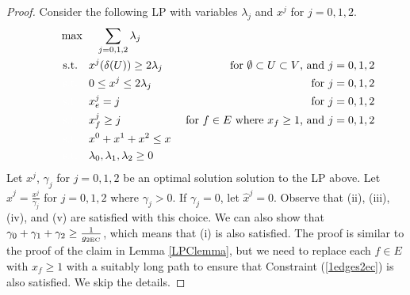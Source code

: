 \begin{proof}
	Consider the following LP with variables $\lambda_j$ and $x^j$ for $j=0,1,2$. 
	\begin{align}
		\quad\quad& \max\quad \;\sum_{j=0,1,2}\lambda_j\\
		&\;\text{s.t.} \quad x^j(\delta(U))\geq 2\lambda_j \;& \mbox{ for $\emptyset \subset U \subset V$, and $j=0,1,2$} \label{feasibility2ec}\\
		&\;{\color{white}{\text{s.t.}} }\quad 0 \leq x^j \leq 2\lambda_j\; &\mbox{ for $j=0,1,2$}\label{bound2ec}\\
		&\;{\color{white}{\text{s.t.}} }\quad x^j_e = j\; &\mbox{ for $j=0,1,2$}\label{branchcoordinate2ec}\\
		&\;{\color{white}{\text{s.t.}} }\quad x^j_f \geq j \; &\mbox{ for $f\in E$ where $x_f \geq 1$, and $j=0,1,2$}\label{1edges2ec}\\
		&\;{\color{white}{\text{s.t.}} }\quad x^0 + x^1+x^2 \leq x\label{packing2ec}\\
		&\;{\color{white}{\text{s.t.}} }\quad \lambda_0,\lambda_1,\lambda_2 \geq 0
	\end{align}	Let $x^j$, $\gamma_j$ for $j=0,1,2$ be an optimal solution solution to the LP above. Let $\hat{x}^{j}=\frac{x^j}{\gamma_j}$ for $j=0,1,2$ where $\gamma_j>0$. If $\gamma_j=0$, let $\hat{x}^{j}=0$. Observe that  (ii), (iii), (iv), and (v) are satisfied with this choice. We can also show that $\gamma_0+\gamma_1+\gamma_2\geq \frac{1}{g_{\operatorname{2EC}}}$, which means that (i) is also satisfied. The proof is similar to the proof of the claim in Lemma \ref{LPClemma}, but we need to replace each $f\in E$ with $x_f\geq 1$ with a suitably long path to ensure that Constraint (\ref{1edges2ec}) is also satisfied.	We skip the details.
\end{proof}

